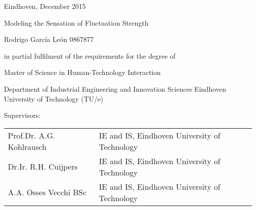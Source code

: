 \documentclass[main.tex]{subfiles}
\begin{document}
Eindhoven, December 2015

Modeling the Sensation of Fluctuation Strength

Rodrigo García León
0867877

in partial fulfilment of the requirements for the degree of

Master of Science
in Human-Technology Interaction

Department of Industrial Engineering and Innovation Sciences
Eindhoven University of Technology (TU/e)

Supervisors:

\begin{tabu}{l l}
  Prof.Dr. A.G. Kohlrausch & IE and IS, Eindhoven University of Technology \\
  Dr.Ir. R.H. Cuijpers & IE and IS, Eindhoven University of Technology \\
  A.A. Osses Vecchi BSc & IE and IS, Eindhoven University of Technology\\
\end{tabu}
\end{document}
